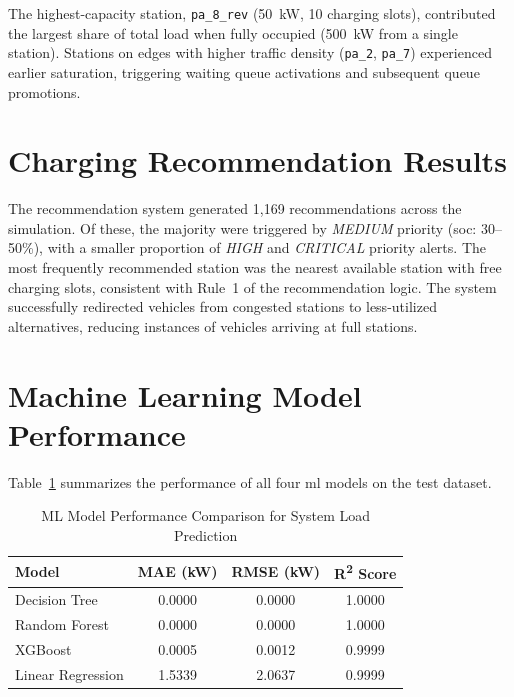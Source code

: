 \documentclass{thesis-library}
\begin{document}
The highest-capacity station, \texttt{pa\_8\_rev} (50~kW, 10 charging slots), contributed
the largest share of total load when fully occupied (500~kW from a single station).
Stations on edges with higher traffic density (\texttt{pa\_2}, \texttt{pa\_7})
experienced earlier saturation, triggering waiting queue activations and subsequent
queue promotions.

\section{Charging Recommendation Results}

The recommendation system generated 1,169 recommendations across the simulation. Of these,
the majority were triggered by \textit{MEDIUM} priority (\Gls{soc}: 30--50\%), with a
smaller proportion of \textit{HIGH} and \textit{CRITICAL} priority alerts. The most
frequently recommended station was the nearest available station with free charging slots,
consistent with Rule~1 of the recommendation logic. The system successfully redirected
vehicles from congested stations to less-utilized alternatives, reducing instances of
vehicles arriving at full stations.

\section{Machine Learning Model Performance}

Table~\ref{tab:ml_results} summarizes the performance of all four \Gls{ml} models on the
test dataset.

\begin{table}[htbp]
\caption{ML Model Performance Comparison for System Load Prediction}
\label{tab:ml_results}
\begin{center}
\begin{tabular}{|l|c|c|c|}
\hline
\textbf{Model} & \textbf{MAE (kW)} & \textbf{RMSE (kW)} & \textbf{R\textsuperscript{2} Score} \\
\hline
Decision Tree      & 0.0000 & 0.0000 & 1.0000 \\
Random Forest      & 0.0000 & 0.0000 & 1.0000 \\
XGBoost            & 0.0005 & 0.0012 & 0.9999 \\
Linear Regression  & 1.5339 & 2.0637 & 0.9999 \\
\hline
\end{tabular}
\end{center}
\end{table}
\end{document}
